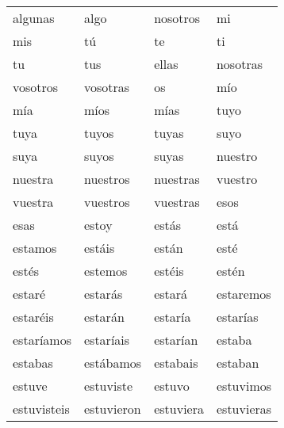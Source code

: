 \begin{table}
\begin{tabular}{l l l l}
	 algunas      & 
	 algo       &
	 nosotros    &
	 mi           \\
	 mis           &
	 t\'u           & 
	 te         &
	 ti      \\
	 tu        & 
	 tus      &
	 ellas     &
	 nosotras   \\   
	 vosotros     &
	 vosotras      &
	 os             &
	 m\'io          \\
	 m\'ia            &
	 m\'ios           &
	 m\'ias           &
	 tuyo       \\
	 tuya         &  
	 tuyos         & 
	 tuyas          &
	 suyo        \\
	 suya          & 
	 suyos          &
	 suyas          &
	 nuestro       \\
	 nuestra        &
	 nuestros       &
	 nuestras       &
	 vuestro       \\
	 vuestra        &
	 vuestros       &
	 vuestras       &
	 esos        \\
	 esas  &
	 estoy &
	 est\'as &
	 est\'a \\
	 estamos &
	 est\'ais &
	 est\'an &
	 est\'e \\ 
	 est\'es &
	 estemos &
	 est\'eis &
	 est\'en \\
	 estar\'e &
	 estar\'as &
	 estar\'a &
	 estaremos \\
	 estar\'eis & 
	 estar\'an &
	 estar\'ia &
	 estar\'ias \\
	 estar\'iamos &
	 estar\'iais &
	 estar\'ian & 
	 estaba  \\
	 estabas &
	 est\'abamos &
	 estabais &
	 estaban \\
	 estuve &
	 estuviste &
	 estuvo &
	 estuvimos \\
	 estuvisteis &
	 estuvieron &
	 estuviera &
	 estuvieras \\
	
	

	\end{tabular}
	\end{table}
	
